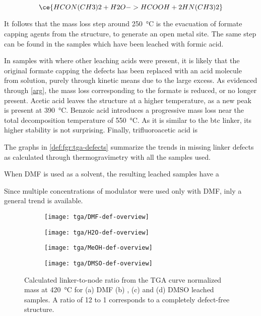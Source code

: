 \begin{equation}\label{def:eqn:dmf-hydrolysis}
    \ce{HCON(CH3)2 + H2O -> HCOOH + 2HN(CH3)2}
\end{equation}

It follows that the mass loss step around \SI{250}{\degreeCelsius}
is the evacuation of formate capping agents from the 
structure, to generate an open metal site. The same step
can be found in the samples which have been leached with
formic acid.

In samples with where other leaching acids were present,
it is likely that the original formate capping the defects 
has been replaced with an acid molecule from solution,
purely through kinetic means due to the large excess.
As evidenced through \autoref{arg}, the mass loss corresponding 
to the formate is reduced, or no longer present. 
Acetic acid leaves the 
structure at a higher temperature, as 
a new peak is present at \SI{390}{\degreeCelsius}.
Benzoic acid introduces a progressive mass loss near the
total decomposition temperature of \SI{550}{\degreeCelsius}.
As it is similar to the btc linker, its higher stability
is not surprising. Finally, trifluoroacetic acid is 

The graphs in \autoref{def:fgr:tga-defects} summarize the 
trends in missing linker defects as calculated through 
thermogravimetry with all the samples used.



When DMF is used as a solvent, the resulting leached samples 
have a 

Since multiple concentrations of modulator were used only with 
DMF, inly a general trend is available.


\begin{figure}[htb]
    \centering

    \begin{subfigure}{0.45\linewidth}
        \texttt{[image: tga/DMF-def-overview]}%
        \label{def:fgr:tga-dmf-linkers}
    \end{subfigure}
    \begin{subfigure}{0.45\linewidth}
        \texttt{[image: tga/H2O-def-overview]}%
        \label{def:fgr:tga-h2o-linkers}
    \end{subfigure}

    
    \begin{subfigure}{0.45\linewidth}
        \texttt{[image: tga/MeOH-def-overview]}%
        \label{def:fgr:tga-meoh-linkers}
    \end{subfigure}
    \begin{subfigure}{0.45\linewidth}
        \texttt{[image: tga/DMSO-def-overview]}%
        \label{def:fgr:tga-dmso-linkers}
    \end{subfigure}

    \caption{Calculated linker-to-node ratio from the TGA curve 
    normalized mass at \SI{420}{\degreeCelsius} for (a) DMF 
    (b) , (c)  and (d) DMSO leached samples.
    A ratio of 12 to 1 corresponds to a completely defect-free
    structure.}%
    \label{def:fgr:tga-defects}
    
\end{figure}
